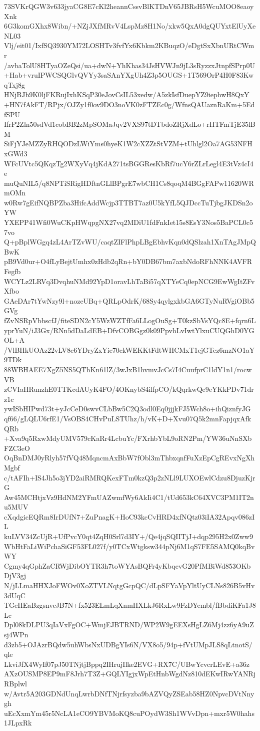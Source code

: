 73SVKrQGW3v633jyaCG8E7cKl2heannCssvBlKTDnV65JBRsH5WcuMOO8eaoyXnk
6G3komGXhx8Wibn/+NZjJXfMRvV4LspMz8H1No/xkw5QxA0dgQUYxtElUyXeNL03
Vlj/eit01/IxfSQ3930YM72LOSHTv3fvfYx6Kbkm2KBuqzO/eDgtSxXbnURtCWmr
/avbaTolU8HTyaOZeQsi/ua+dwN+YhKhas34JsHVWJn9jL3sRyzzxJtnpfSPrp0U
+Hab+vruIPWCSQGlvQVYy3saSAnYXgUh4Z3p5OUGS+1T569OrP4H0F83KwqTxj8g
HNjBJb9K0ljFKRujIxhKSqP30eJovCsIL53xedw/A5zkIsfDuepYZ9iephwH8QxY
+HN7fAkFT/RPjx/OJZy1f0ov9DO3noVK0zFTZEc0g/WfnsQAUaznRaKm+5EdfSPU
IfrP2Zln50sdVd1cobBB2zMpSOMaJqv2VXS97tDTbdoZRjXdLo+rHTFmTjE35lBM
SiFjYJeMZZyRHQODzLWiYms0hyeK1W2cXZZtStVZM+tUhlgl2Oa7AG53NFHxGWd3
WFcUVtc5QKqzTg2WXyVq4jKdA271tsBGGResKbRf7ucY6rZLrLegl4E3tVz4cI4e
muQuNIL5/q8NPTiSRigHDftnGLlBPgrE7wbCH1Cs8qoqM4BGgFAPw11620WRmOMn
w0Rw7gEifNQBPZba3HifcAddWcjp3TTBT7az0U5kYfL5QJDccTuTjbgJKDSn2oYW
YXEPP41Wfi0WuCKpHWqpgNX27vq2MDiU1fdFnkIet15s8EsY3Nos5BaPCL0c57vo
Q+pBplWGgq4zL4ArTZvWU/caqtZIFlPhpLBgEbhvKqn0dQSlzah1XnTAgJMpQBwK
pB9Vd0ur+O4fLyBejtUmhx0zHdb2qRn+bY0DB67bm7axbNdoRFhNNK4AVFRFegfb
WCYLz2LRVq3DvqhuNMd92YpD1oravLhTaBi57qXTYeCq0epNCG9EwWgItZFvXfbo
GAeDAr7tYwNzy9l+nozeUBq+QRLpOdrK/68Sy4qylgxkbGA6GTyNuRVgiOBb5GVg
fZvNSRpVbbscfJ/fiteSDN2cY5WzWZTfFa6LLogOuSg+T0kzSbVsYQc8E+fqrn6L
yprYuN/iJ3Gx/RNn5dDaLdEB+DfvCOBGgz0k09PpvhLvIwtYlxuCUQGhD0YGOL+A
/VlBHkUOAz22vLV8e6YDryZxYie70ckWEKKtFdtWHCMxT1ejGTez6mzNO1aY9TDk
88WBHAEE7XgZ5NS5QThKn61lZ/3wJxB1hvmvJcCs7I4CuufprC1ldY1n1/rocwVB
zCVIaHRunzhE0TTKcdAUyK4FO/4OKnybS4ilfpCO/kQqrkwQe9eYKkPDv71drz1c
ywISbHIPwd73t+yJcCeD0swvCLbBw5C2Q3odl0Eq0jjjkFJ5Wch8o+ihQiznfyJG
qf66/gLQLU6rfE1/VsOBS4CHvPuLSTUhz/h/vK+D+Xvu07Q5k2mnFapjqxAfkQRb
+Xva9q5RxwMdyUMV579cKaRr4LcbuYc/FXrhbYbL9oRN2Pm/YW36uNnSXbFZC3eO
OqBnDMJ0yRlyh57fVQ48MqncmAxBbW7fObl3mThbxqnfFuXzEpCgREvxNgXhMgbf
c/tAFIh+IS4Jh5o3jYD2aiRMRQKexFTm0kzQ3p2zNLl9LUXOEwlCdzu8DjuzKjrG
Aw45MCHtjxVz9HdNM2YFmUAZwmfWy6AkIi4C1/tUd653kC64XVC3PM1IT2nu5MUV
cXqdgicEQRm8IrDUfN7+ZuPnagK+HoC93kcCvHRD4xfNQtz03iIA32Apqv086zIL
kuLVV34ZcUjR+UfPvcY0qt4ZqH0Srl7d3IY+/Qe4jqSQIITjJ+dqp295H2x0Zww9
WbHtFaLiWiPchaSiGF53FL027f/y0TCxWtgksw344pNj6M1qS7FE5SAMQ0kqBvWY
Cgmy4qGphZaCRWjDibOYTR3h7toWYAsBQFr4yKbqevG20PfMBiWd853OKbDjV3gj
N/jLLmaHHXJoFWOv0XoZTVLNqtgGcpQC/dLpSFYaVpYltUyCLNs826B5vHv3dUqC
TGeHEaBzgsnvcJB7N+fx523ELmLqXnmHXLkJ6RxLw9FzDYembl/fBbdiKFa1J8Lc
Dpl08kDLPU3qIaVxFgOC+WmjEJBTRND/WP2W9gEEXsHgLZ6Mj4zz6yA9uZsj4WPn
d3zb5+OJAzrBQdw5uhWbsNxUDBgYIs6N/VX8o5/94p+fVtUMpJLS8qLtnotS/qle
LkviJfX4WyIf07pJ50TNjtjBppq2IHrujIlke2EVG+RX7C/UBwYcvcrLEvE+a36z
AXzOUSMP8EP9mF8Jrh7T3Z+GQLYIgjxWpEtHnbWgdNz810dEKwIRwYANRjRBplwl
w/Avtr5A203GDNdUnqLwrbDNfTNjrfsyzba9bAZVQyZSEab58HZ0NpvcDVtNnygh
uEcXxmYm45r5NcLA1eCO9YBVMoKQ8cuPOydW3Sh1WVvDpn+mxr5W0hahs1JLpxRk
